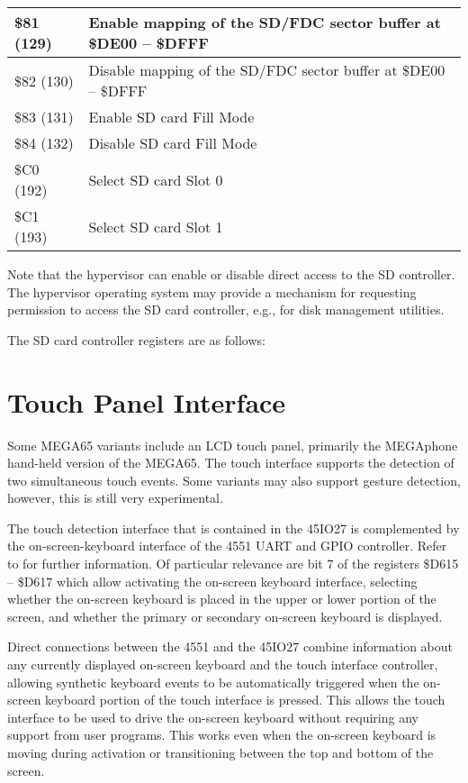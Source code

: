 \begin{longtable}{|L{2.4cm}|L{8cm}|}
 \hline
\small \$81 (129) & Enable mapping of the SD/FDC sector buffer at
\$DE00 -- \$DFFF \\
 \hline
\small \$82 (130) & Disable mapping of the SD/FDC sector buffer at
\$DE00 -- \$DFFF \\
 \hline
\small \$83 (131) & Enable SD card Fill Mode \\
 \hline
\small \$84 (132) & Disable SD card Fill Mode \\
 \hline
\small \$C0 (192) & Select SD card Slot 0 \\
 \hline
\small \$C1 (193) & Select SD card Slot 1 \\
 \hline
   \end{longtable}


Note that the hypervisor can enable or disable direct access to the SD
controller. The hypervisor operating system may provide a mechanism
for requesting permission to access the SD card controller, e.g., for
disk management utilities.

The SD card controller registers are as follows:



\section{Touch Panel Interface}

Some MEGA65 variants include an LCD touch panel, primarily the
MEGAphone hand-held version of the MEGA65.  The touch interface
supports the detection of two simultaneous touch events.  Some
variants may also support gesture detection, however, this is still
very experimental.

The touch detection interface that is contained in the 45IO27 is
complemented by the on-screen-keyboard interface of the 4551 UART and
GPIO controller.  Refer to  for further
information.  Of particular relevance are bit 7 of the registers \$D615 --
\$D617 which allow activating the on-screen keyboard interface,
selecting whether the on-screen keyboard is placed in the upper or
lower portion of the screen, and whether the primary or secondary
on-screen keyboard is displayed.

Direct connections between the 4551 and the 45IO27 combine information
about any currently displayed on-screen keyboard and the touch
interface controller, allowing synthetic keyboard events to be
automatically triggered when the on-screen keyboard portion of the
touch interface is pressed.  This allows the touch interface to be
used to drive the on-screen keyboard without requiring any support
from user programs. This works even when the on-screen keyboard is
moving during activation or transitioning between the top and bottom
of the screen.

